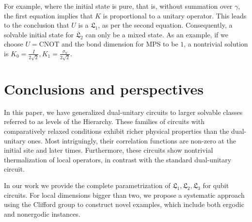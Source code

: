 \documentclass[aps,prx,twocolumn,notitlepage,nofootinbib,nobalancelastpage]{revtex4-2}
\theoremstyle{break}
\newcommand{\1}{\mathbbm{1}}
\theoremstyle{plain}
\theoremstyle{plain}
\theoremstyle{plain}
\newcommand{\pk}[1]{{\color{blue}[#1]}}
\begin{document}
For example, where the initial state is pure, that is, without summation
over $\gamma$, the first equation implies that $K$ is proportional
to a unitary operator. This leads to the conclusion that $U$ is a $\mathfrak{L}_1$, as per the second equation. Consequently, a solvable initial
state for $\overline{\mathfrak{L}}_2$ can only be a mixed state. As an example, if we choose $U=\mathrm{CNOT}$ and the bond dimension for
MPS to be $1$, a nontrivial solution is $K_{0}=\frac{I}{2\sqrt{2}},K_{1}=\frac{\sigma_{Y}}{2\sqrt{2}}$.



\section{Conclusions and perspectives}
\label{sec:conclusions}

In this paper, we have generalized dual-unitary circuits to larger solvable classes referred to as levels of the Hierarchy. These families of circuits with comparatively relaxed conditions exhibit richer physical properties than the dual-unitary ones. Most intriguingly, their correlation functions are non-zero at the initial site and later times. Furthermore, these circuits show  nontrivial thermalization of local operators, in contrast with the standard dual-unitary circuit. 

In our work we provide the complete parametrization of $\mathfrak{L}_1,\mathfrak{L}_2,\mathfrak{L}_3$ for qubit circuits. For local dimensions bigger than two, we propose a systematic approach using the Clifford group to construct novel examples, which include both ergodic and nonergodic instances.
\end{document}
